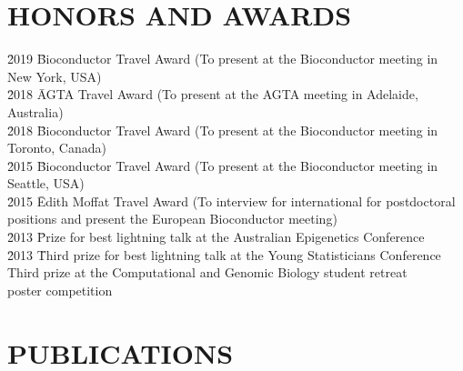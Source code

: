 \documentclass[11pt,letterpaper,pdf]{article}
\begin{document}
\section*{HONORS AND AWARDS}

\begin{tabbing}
  \= 2019 \hspace*{0.5cm} \= Bioconductor Travel Award (To present at the Bioconductor meeting in New York, USA)\\
  \= 2018 \hspace*{0.5cm} \= AGTA Travel Award (To present at the AGTA meeting in Adelaide, Australia)\\
  \= 2018 \hspace*{0.5cm} \= Bioconductor Travel Award (To present at the Bioconductor meeting in Toronto, Canada)\\
  \= 2015 \hspace*{0.5cm} \= Bioconductor Travel Award (To present at the Bioconductor meeting in Seattle, USA)\\
  \= 2015 \hspace*{0.5cm} \= Edith Moffat Travel Award (To interview for international for postdoctoral positions and present the European Bioconductor meeting)\\
  \= 2013 \hspace*{0.5cm} \= Prize for best lightning talk at the Australian Epigenetics Conference\\
  \= 2013 \hspace*{0.5cm} \= Third prize for best lightning talk at the Young Statisticians Conference\\
   \> Third prize at the Computational and Genomic Biology student retreat \\
  \>\>poster competition \\
\end{tabbing}



\section*{PUBLICATIONS}

\nocite{*}
\end{document}

